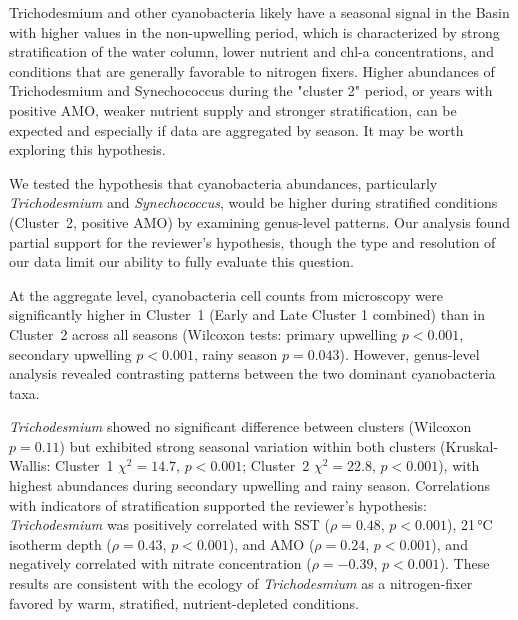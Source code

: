 \documentclass[12pt,english]{reviewresponse}
\begin{document}
\begin{revcomment}
Trichodesmium and other cyanobacteria likely have a seasonal signal in the Basin with higher values in the non-upwelling period, which is characterized by strong stratification of the water column, lower nutrient and chl-a concentrations, and conditions that are generally favorable to nitrogen fixers. Higher abundances of Trichodesmium and Synechococcus during the "cluster 2" period, or years with positive AMO, weaker nutrient supply and stronger stratification, can be expected and especially if data are aggregated by season. It may be worth exploring this hypothesis.
\end{revcomment}
\begin{revresponse}
	We tested the hypothesis that cyanobacteria abundances, particularly \textit{Trichodesmium} and \textit{Synechococcus}, would be higher during stratified conditions (Cluster~2, positive AMO) by examining genus-level patterns. Our analysis found partial support for the reviewer's hypothesis, though the type and resolution of our data limit our ability to fully evaluate this question.

    At the aggregate level, cyanobacteria cell counts from microscopy were significantly higher in Cluster~1 (Early and Late Cluster 1 combined) than in Cluster~2 across all seasons (Wilcoxon tests: primary upwelling $p < 0.001$, secondary upwelling $p < 0.001$, rainy season $p = 0.043$). However, genus-level analysis revealed contrasting patterns between the two dominant cyanobacteria taxa.

    \textit{Trichodesmium} showed no significant difference between clusters (Wilcoxon $p = 0.11$) but exhibited strong seasonal variation within both clusters (Kruskal-Wallis: Cluster~1 $\chi^2 = 14.7$, $p < 0.001$; Cluster~2 $\chi^2 = 22.8$, $p < 0.001$), with highest abundances during secondary upwelling and rainy season. Correlations with indicators of stratification supported the reviewer's hypothesis: \textit{Trichodesmium} was positively correlated with SST ($\rho = 0.48$, $p < 0.001$), 21\,°C isotherm depth ($\rho = 0.43$, $p < 0.001$), and AMO ($\rho = 0.24$, $p < 0.001$), and negatively correlated with nitrate concentration ($\rho = -0.39$, $p < 0.001$). These results are consistent with the ecology of \textit{Trichodesmium} as a nitrogen-fixer favored by warm, stratified, nutrient-depleted conditions.


\end{revresponse}
\end{document}
